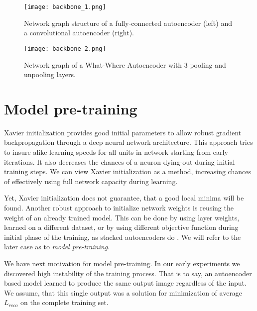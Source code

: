 \begin{figure}[H]
  \centering
  \texttt{[image: backbone\_1.png]}
  \caption{Network graph structure of a fully-connected autoencoder (left) and a convolutional autoencoder (right).}
  \label{fig:tf_graph_1}
\end{figure}
\begin{figure}[H]
  \centering
    \texttt{[image: backbone\_2.png]}
  \caption{Network graph of a What-Where Autoencoder with 3 pooling and unpooling layers.}
  \label{fig:tf_graph_2}
\end{figure}

\section{Model pre-training}

Xavier initialization provides good initial parameters to allow robust gradient backpropagation through a deep neural network architecture.
This approach tries to insure alike learning speeds for all units in network starting from early iterations.
It also decreases the chances of a neuron dying-out during initial training steps.
We can view Xavier initialization as a method, increasing chances of effectively using full network capacity during learning.

Yet, Xavier initialization does not guarantee, that a good local minima will be found.
Another robust approach to initialize network weights is reusing the weight of an already trained model.
This can be done by using layer weights, learned on a different dataset, or by using different objective function during initial phase of the training, as stacked autoencoders do \cite{Yosinski2014}.
We will refer to the later case as to \textit{model pre-training}.

We have next motivation for model pre-training.
In our early experiments we discovered high instability of the training process.
That is to say, an autoencoder based model learned to produce the same output image regardless of the input.
We assume, that this single output was a solution for minimization of average $L_{reco}$ on the complete training set.

